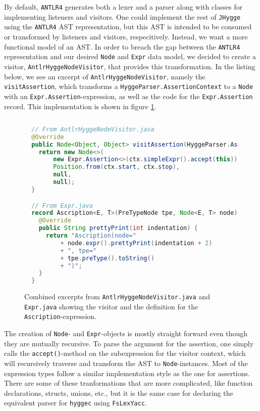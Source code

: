 By default, \texttt{ANTLR4} generates both a lexer and a parser along with classes for implementing listeners and visitors.
One could implement the rest of \texttt{JHygge} using the \texttt{ANTLR4} AST representation, but this AST is intended to
be consumed or transformed by listeners and visitors, respecitively. Instead, we want a more functional model of an AST.
In order to breach the gap between the \texttt{ANTLR4} representation and our desired \texttt{Node} and \texttt{Expr} data model,
we decided to create a visitor, \texttt{AntlrHyggeNodeVisitor}, that provides this transformation. In the listing below, we
see an excerpt of \texttt{AntlrHyggeNodeVisitor}, namely the \texttt{visitAssertion}, which transforms a \texttt{HyggeParser.AssertionContext}
to a \texttt{Node} with an \texttt{Expr.Assertion}-expression, as well as the code for the \texttt{Expr.Assertion} record.
This implementation is shown in figure \ref{fig:antlr_node_visitor}.

\begin{figure}[H]
\centering 
\begin{lstlisting}[language=Java]
 
  // From AntlrHyggeNodeVisitor.java
  @Override
  public Node<Object, Object> visitAssertion(HyggeParser.AssertionContext ctx) {
    return new Node<>(
        new Expr.Assertion<>(ctx.simpleExpr().accept(this)),
        Position.from(ctx.start, ctx.stop),
        null,
        null);
  }

  // From Expr.java
  record Ascription<E, T>(PreTypeNode tpe, Node<E, T> node) implements Expr<E, T> {
    @Override
    public String prettyPrint(int indentation) {
      return "Ascription(node="
          + node.expr().prettyPrint(indentation + 2)
          + ", tpe="
          + tpe.preType().toString()
          + ")";
    }
  }

\end{lstlisting}
\caption{Combined excerpts from \texttt{AntlrHyggeNodeVisitor.java} and \texttt{Expr.java} showing the visitor and the definition for the \texttt{Ascription}-expression. }
\label{fig:antlr_node_visitor}
\end{figure}

The creation of \texttt{Node}- and \texttt{Expr}-objects is mostly straight forward even though they are mutually recursive.
To parse the argument for the assertion, one simply calls the \texttt{accept()}-method on the subexpression for the visitor
context, which will recursively traverse and transform the AST to \texttt{Node}-instances. Most of the expression types
follow a similar implementation style as the one for assertions. There are some of these tranformations that are more complicated,
like function declarations, structs, unions, etc., but it is the same case for declaring the equivalent parser for \texttt{hyggec}
using \texttt{FsLexYacc}.

